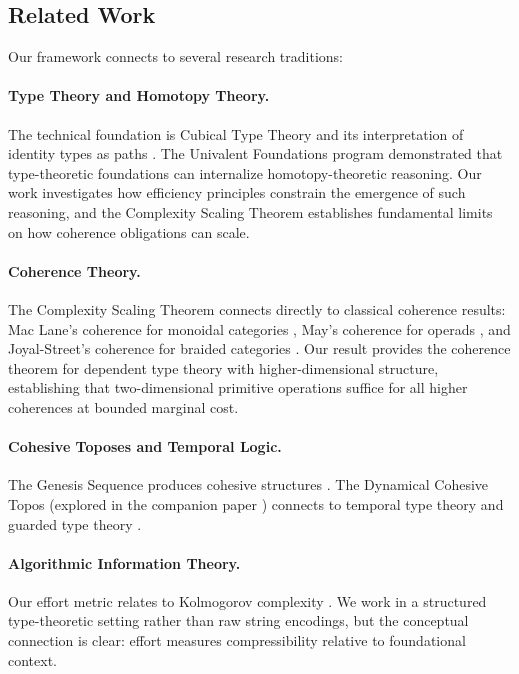 \documentclass[11pt]{article}
\theoremstyle{definition}
\theoremstyle{remark}
\begin{document}
\subsection{Related Work}

Our framework connects to several research traditions:

\paragraph{Type Theory and Homotopy Theory.}
The technical foundation is Cubical Type Theory \cite{cohen2018cubical} and its interpretation of identity types
as paths \cite{awodey2009homotopy}. The Univalent Foundations program \cite{hott-book} demonstrated that
type-theoretic foundations can internalize homotopy-theoretic reasoning. Our work investigates
how efficiency principles constrain the emergence of such reasoning, and the Complexity Scaling
Theorem establishes fundamental limits on how coherence obligations can scale.

\paragraph{Coherence Theory.}
The Complexity Scaling Theorem connects directly to classical coherence results: Mac Lane's
coherence for monoidal categories \cite{maclane1963natural}, May's coherence for operads \cite{may1972geometry},
and Joyal-Street's coherence for braided categories \cite{joyal1993braided}. Our result provides the
coherence theorem for dependent type theory with higher-dimensional structure, establishing that
two-dimensional primitive operations suffice for all higher coherences at bounded marginal cost.

\paragraph{Cohesive Toposes and Temporal Logic.}
The Genesis Sequence produces cohesive structures \cite{lawvere1994cohesive,schreiber2013differential}. The Dynamical
Cohesive Topos (explored in the companion paper \cite{lande2025genesis}) connects to temporal type
theory \cite{schultz2017temporal} and guarded type theory \cite{clouston2019guarded,birkedal2017guarded}.

\paragraph{Algorithmic Information Theory.}
Our effort metric relates to Kolmogorov complexity \cite{kolmogorov1965three,chaitin1966length,li2008kolmogorov}.
We work in a structured type-theoretic setting rather than raw string encodings, but the conceptual
connection is clear: effort measures compressibility relative to foundational context.
\end{document}
